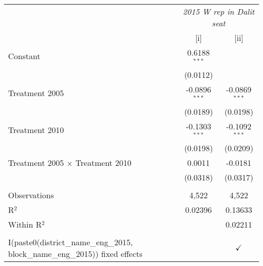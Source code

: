 
\begingroup
\centering
\begin{tabular}{lcc}
   \toprule
    & \multicolumn{2}{c}{\textit{2015 W rep in Dalit seat}}\\
                                                                                    & [i]             & [ii]\\  
   \midrule 
   Constant                                                                         & 0.6188$^{***}$  &   \\   
                                                                                    & (0.0112)        &   \\   
   Treatment 2005                                                                   & -0.0896$^{***}$ & -0.0869$^{***}$\\   
                                                                                    & (0.0189)        & (0.0198)\\   
   Treatment 2010                                                                   & -0.1303$^{***}$ & -0.1092$^{***}$\\   
                                                                                    & (0.0198)        & (0.0209)\\   
   Treatment 2005 $\times$ Treatment 2010                                           & 0.0011          & -0.0181\\   
                                                                                    & (0.0318)        & (0.0317)\\   
    \\
   Observations                                                                     & 4,522           & 4,522\\  
   R$^2$                                                                            & 0.02396         & 0.13633\\  
   Within R$^2$                                                                     &                 & 0.02211\\  
    \\
   I(paste0(district\_name\_eng\_2015, block\_name\_eng\_2015)) fixed effects       &                 & $\checkmark$\\   
   \bottomrule
\end{tabular}
\par\endgroup


